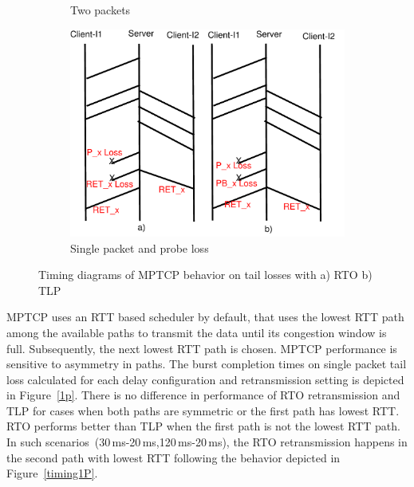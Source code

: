 \documentclass[10pt,conference,compsoc]{IEEEtran}
\begin{document}
\begin{figure}[!tbp]
\begin{subfigure}[b]{0.32\textwidth}
	\caption{Two packets }\label{timing2P}
 \end{subfigure} 
 \hfill
 \begin{subfigure}[b]{0.32\textwidth}
  	\includegraphics[angle=0, width=\textwidth, natwidth=610, natheight=400]{images/timing1PP.pdf}
	\caption{Single packet and probe loss}\label{timing1PP}
 \end{subfigure}
 \caption{Timing diagrams of MPTCP behavior on tail losses with a) RTO b) TLP }\label{mptiming}	
\end{figure}


MPTCP uses an RTT based scheduler by default, that uses the lowest RTT path among the available paths to transmit
the data until its congestion window is full. Subsequently, the next lowest RTT path is chosen. MPTCP performance
is sensitive to asymmetry in paths. The burst completion times on single packet tail loss calculated for each delay 
configuration and retransmission setting is depicted in Figure~\ref{1p}. There is no difference in performance of RTO retransmission and TLP for 
cases when both paths are symmetric or the first path has lowest RTT. RTO performs better than TLP when the first path is not the lowest RTT path. In such
scenarios~(30\,ms-20\,ms,120\,ms-20\,ms), the RTO retransmission happens in the second path with lowest RTT following the behavior depicted
in Figure~\ref{timing1P}.
\end{document}
